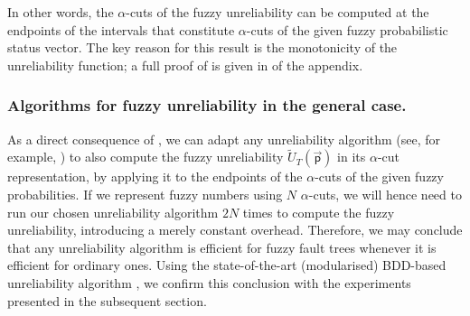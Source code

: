 \documentclass[runningheads]{llncs}
\newcommand{\colorpar}[3]{\colorbox{#1}{\parbox{#2}{#3}}}
\newcommand{\marginremark}[3]{\marginpar{\colorpar{#2}{7em}{\color{#1}#3}}}
\newcommand{\mlz}[1]{\marginremark{black}{orange}{\tiny{[MLZ]~ #1}}}
\begin{document}
In other words, the $\alpha$-cuts of the fuzzy unreliability can be computed at the endpoints of the intervals that constitute $\alpha$-cuts of the given fuzzy probabilistic status vector. The key reason for this result is the monotonicity of the unreliability function; a full proof of  is given in  of the appendix. 


\subsubsection{Algorithms for fuzzy unreliability in the general case.}\label{sec:bdd-based-algo} 
As a direct consequence of , 
we can adapt any unreliability algorithm (see, for example, \cite{rauzy1993new}) to also compute the fuzzy unreliability $\widetilde{U}_T(\vec{\mathsf{p}})$ in its $\alpha$-cut representation, by applying it to the endpoints of the $\alpha$-cuts of the given fuzzy probabilities. If we represent fuzzy numbers using $N$ $\alpha$-cuts, we will hence need to run our chosen unreliability algorithm $2N$ times to compute the fuzzy unreliability, introducing a merely constant overhead. Therefore, we may conclude that any unreliability algorithm is efficient for fuzzy fault trees whenever it is efficient for ordinary ones. Using the state-of-the-art (modularised) BDD-based unreliability algorithm \cite{basgoze2022BDDs}, we confirm this conclusion with the experiments presented in the subsequent section.
\end{document}
